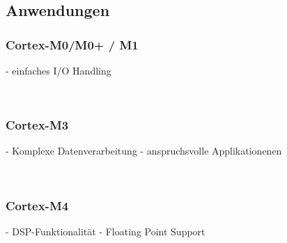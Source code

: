 \subsection{Anwendungen}
    \begin{minipage}{6cm}
       \subsubsection{Cortex-M0/M0+ / M1}  
        - einfaches I/O Handling 
    \end{minipage}
    \begin{minipage}{0.25cm}
    	\-\
    \end{minipage}
    \begin{minipage}{6cm}
        \subsubsection{Cortex-M3}   
        - Komplexe Datenverarbeitung\newline
        - anspruchsvolle Applikationenen
    \end{minipage}
    \begin{minipage}{0.25cm}
    	\-\
    \end{minipage}
    \begin{minipage}{6cm}
        \subsubsection{Cortex-M4}   
       -  DSP-Funktionalität\newline
       -  Floating Point Support
    \end{minipage}

\newpage

